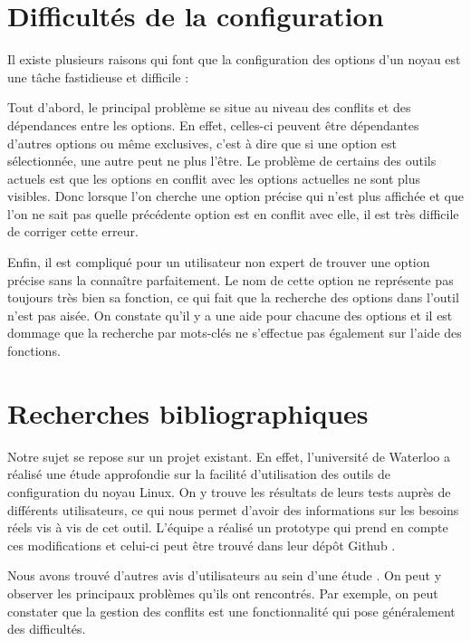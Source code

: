 \documentclass[16pts]{report}
\begin{document}
\chapter{Difficultés de la configuration}

Il existe plusieurs raisons qui font que la configuration des options d’un noyau
    est une tâche fastidieuse et difficile :

Tout d’abord, le principal problème se situe au niveau des conflits et
    des dépendances entre les options. En effet, celles-ci peuvent
    être dépendantes d’autres options ou même exclusives, c’est à dire que si
    une option est sélectionnée, une autre peut ne plus l’être.
    Le problème de certains des outils actuels est que les options en conflit
    avec les options actuelles ne sont plus visibles. Donc lorsque l’on cherche
    une option précise qui n’est plus affichée et que l’on ne sait pas quelle
    précédente option est en conflit avec elle, il est très difficile de
    corriger cette erreur.

Enfin, il est compliqué pour un utilisateur non expert de trouver une
    option précise sans la connaître parfaitement. Le nom de cette option
    ne représente pas toujours très bien sa fonction, ce qui fait que
    la recherche des options dans l’outil n’est pas aisée.
    On constate qu’il y a une aide pour chacune des options et
    il est dommage que la recherche par mots-clés ne s’effectue pas également
    sur l’aide des fonctions.

\chapter{Recherches bibliographiques}

Notre sujet se repose sur un projet existant. En effet, l'université de Waterloo
a réalisé une étude approfondie \cite{Waterloo:Etude} sur la facilité
d'utilisation des outils de configuration du noyau Linux. On y trouve les
résultats de leurs tests auprès de différents utilisateurs, ce qui nous permet
d'avoir des informations sur les besoins réels vis à vis de cet outil. L'équipe
a réalisé un prototype qui prend en compte ces modifications et celui-ci peut
être trouvé dans leur dépôt Github \cite{Waterloo:Github}.

Nous avons trouvé d'autres avis d'utilisateurs au sein d'une étude
\cite{Hubaux:2012:USC:2110147.2110164}. On peut y observer les principaux
problèmes qu'ils ont rencontrés. Par exemple, on peut constater que la gestion
des conflits est une fonctionnalité qui pose généralement des difficultés.
\end{document}
